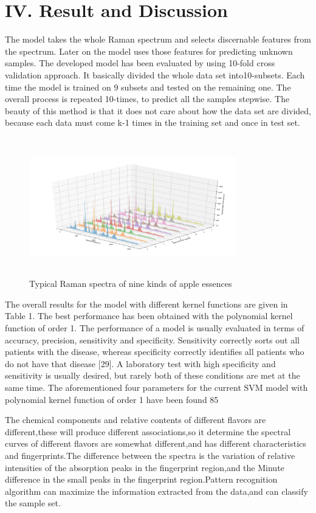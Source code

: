 \documentclass[a4paper]{article}
\begin{document}
\section{IV. Result and Discussion}
The  model  takes  the  whole  Raman  spectrum  and  selects  discernable  features  from the  spectrum.  Later  on  the  model  uses  those  features  for  predicting  unknown  samples.  The developed model has been evaluated by using 10-fold cross validation approach. It basically divided  the  whole  data  set  into10-subsets.  Each  time  the  model  is  trained  on  9  subsets  and tested  on  the  remaining  one.  The  overall  process  is  repeated  10-times,  to  predict  all  the samples stepwise. The beauty of this method is that it does not care about how the data set are divided, because each data must come k-1 times in the training set and once in test set.
\begin{figure}[h]
  \centering
  \includegraphics[width=9cm,height=6cm]{Typical_Raman_spectra}
  \caption{Typical Raman spectra of nine kinds of apple essences}
\end{figure}
The overall results for the model with different kernel functions are given in Table 1. The best  performance  has  been  obtained  with  the  polynomial  kernel  function  of  order  1.  The performance  of  a  model  is  usually  evaluated  in  terms  of  accuracy,  precision,  sensitivity  and specificity.  Sensitivity  correctly  sorts  out  all  patients  with  the  disease,  whereas  specificity correctly identifies all patients who do not have that disease [29]. A laboratory test with high specificity and sensitivity is usually desired, but rarely both of these conditions are met at the same time. The aforementioned four parameters for the current SVM model with polynomial kernel function of order 1 have been found 85%

The chemical components and relative contents of different flavors are different,these will produce different associations,so it  determine the spectral curves of different flavors are somewhat different,and has different  characteristics and fingerprints.The difference between the spectra is the variation of relative intensities of the absorption peaks in the fingerprint region,and the Minute difference in the small peaks in the fingerprint region.Pattern recognition algorithm can maximize the information extracted from the data,and can classify the sample set.
\end{document}
